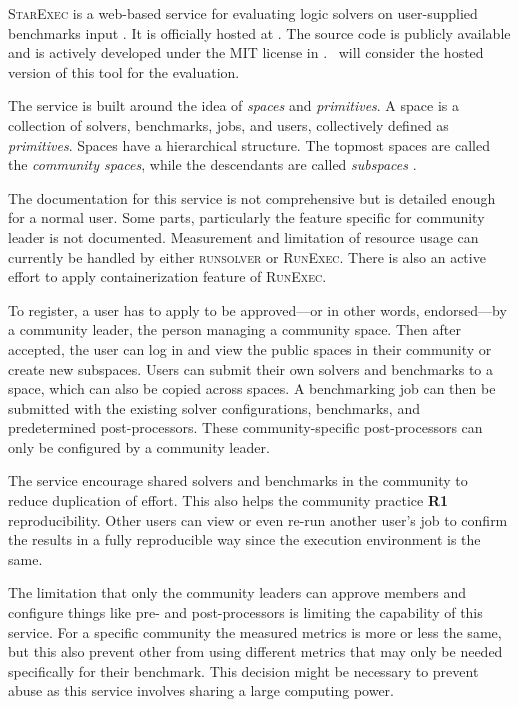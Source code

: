 \textsc{StarExec} is a web-based service for evaluating logic solvers on user-supplied benchmarks input \citep{stumpStarExecCrossCommunityInfrastructure2014}.
It is officially hosted at \href{https://www.starexec.org/}{}.
The source code is publicly available and is actively developed under the MIT license in \citet{StarExecCrossCommunity2019}.
\First~will consider the hosted version of this tool for the evaluation.

The service is built around the idea of \emph{spaces} and \emph{primitives}.
A space is a collection of solvers, benchmarks, jobs, and users, collectively defined as \emph{primitives}.
Spaces have a hierarchical structure.
The topmost spaces are called the \emph{community spaces}, while the descendants are called \emph{subspaces} \citep{stumpStarExecCrossCommunityInfrastructure2014}.

The documentation for this service is not comprehensive but is detailed enough for a normal user.
Some parts, particularly the feature specific for community leader is not documented.
Measurement and limitation of resource usage can currently be handled by either \textsc{runsolver} or \textsc{RunExec}.
There is also an active effort to apply containerization feature of \textsc{RunExec}.

To register, a user has to apply to be approved---or in other words, endorsed---by a community leader, the person managing a community space.
Then after accepted, the user can log in and view the public spaces in their community or create new subspaces.
Users can submit their own solvers and benchmarks to a space, which can also be copied across spaces.
A benchmarking job can then be submitted with the existing solver configurations, benchmarks, and predetermined post-processors.
These community-specific post-processors can only be configured by a community leader.

The service encourage shared solvers and benchmarks in the community to reduce duplication of effort.
This also helps the community practice \textbf{R1} reproducibility.
Other users can view or even re-run another user's job to confirm the results in a fully reproducible way since the execution environment is the same.

The limitation that only the community leaders can approve members and configure things like pre- and post-processors is limiting the capability of this service.
For a specific community the measured metrics is more or less the same, but this also prevent other from using different metrics that may only be needed specifically for their benchmark.
This decision might be necessary to prevent abuse as this service involves sharing a large computing power.

